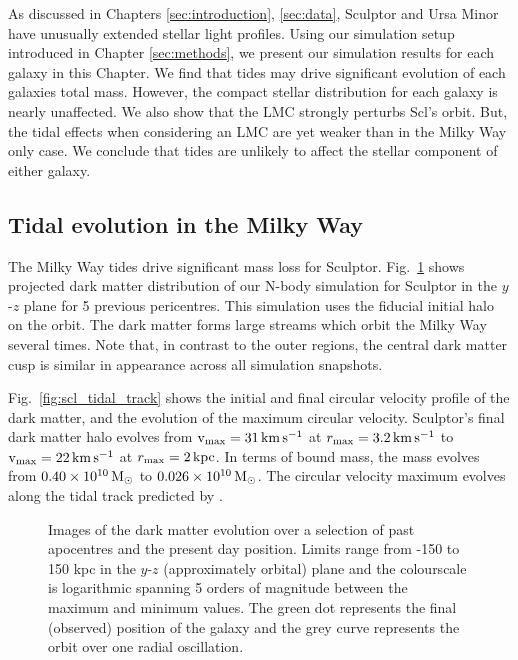 As discussed in Chapters \ref{sec:introduction}, \ref{sec:data},
Sculptor and Ursa Minor have unusually extended stellar light profiles.
Using our simulation setup introduced in Chapter \ref{sec:methods}, we
present our simulation results for each galaxy in this Chapter. We find
that tides may drive significant evolution of each galaxies total mass.
However, the compact stellar distribution for each galaxy is nearly
unaffected. We also show that the LMC strongly perturbs Scl's orbit.
But, the tidal effects when considering an LMC are yet weaker than in
the Milky Way only case. We conclude that tides are unlikely to affect
the stellar component of either galaxy.

\subsection{Tidal evolution in the Milky
Way}\label{tidal-evolution-in-the-milky-way}

The Milky Way tides drive significant mass loss for Sculptor.
Fig.~\ref{fig:scl_sim_images} shows projected dark matter distribution
of our N-body simulation for Sculptor in the \(y\)-\(z\) plane for 5
previous pericentres. This simulation uses the fiducial initial halo on
the \smallperi{} orbit. The dark matter forms large streams which orbit
the Milky Way several times. Note that, in contrast to the outer
regions, the central dark matter cusp is similar in appearance across
all simulation snapshots.

Fig.~\ref{fig:scl_tidal_track} shows the initial and final circular
velocity profile of the dark matter, and the evolution of the maximum
circular velocity. Sculptor's final dark matter halo evolves from
\({\rm v}_{\rm max}=31\,{\rm km\,s^{-1}}\) at \(r_{\rm max}=3.2\,{\rm km\,s^{-1}}\) to \({\rm v}_{\rm max} = 22\,{\rm km\,s^{-1}}\) at
\(r_{\rm max} = 2\,{\rm kpc}\). In terms of bound mass, the mass evolves from
\(0.40 \times 10^{10}\,{\rm M}_{\odot}\) to \(0.026\times10^{10}\,{\rm M}_{\odot}\). The
circular velocity maximum evolves along the tidal track predicted by
\citet{EN2021}.

\begin{figure}
\centering
{}
\caption[Sculptor simulation snapshots]{Images of the dark matter
evolution over a selection of past apocentres and the present day
position. Limits range from -150 to 150 kpc in the \(y\)-\(z\)
(approximately orbital) plane and the colourscale is logarithmic
spanning 5 orders of magnitude between the maximum and minimum values.
The green dot represents the final (observed) position of the galaxy and
the grey curve represents the orbit over one radial
oscillation.}\label{fig:scl_sim_images}
\end{figure}

